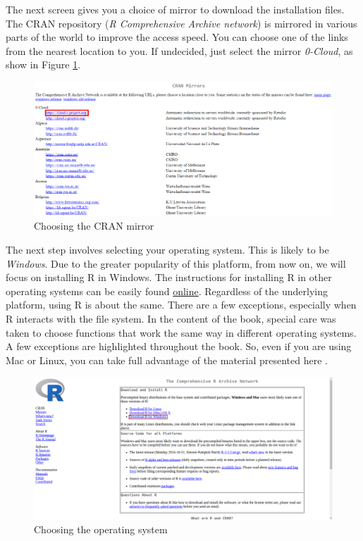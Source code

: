 \documentclass[11pt,]{book}
\begin{document}
The next screen gives you a choice of mirror to download the
installation files. The CRAN repository (\emph{R Comprehensive Archive
network}) is mirrored in various parts of the world to improve the
access speed. You can choose one of the links from the nearest location
to you. If undecided, just select the mirror \emph{0-Cloud}, as show in
Figure \ref{fig:website-cran-2}.

\begin{figure}[!htbp]

{\centering \includegraphics[width=1\linewidth]{figs/website_cran_2} 

}

\caption{Choosing the CRAN mirror}\label{fig:website-cran-2}
\end{figure}

The next step involves selecting your operating system. This is likely
to be \emph{Windows}. Due to the greater popularity of this platform,
from now on, we will focus on installing R in Windows. The instructions
for installing R in other operating systems can be easily found
\href{https://www.google.com.br/webhp?sourceid=chrome-instant\&ion=1\&espv=2\&ie=UTF-8\#q=installing+r\&*}{online}.
Regardless of the underlying platform, using R is about the same. There
are a few exceptions, especially when R interacts with the file system.
In the content of the book, special care was taken to choose functions
that work the same way in different operating systems. A few exceptions
are highlighted throughout the book. So, even if you are using Mac or
Linux, you can take full advantage of the material presented here .

\begin{figure}[!htbp]

{\centering \includegraphics[width=1\linewidth]{figs/website_cran_3} 

}

\caption{Choosing the operating system}\label{fig:website-cran-3}
\end{figure}
\end{document}
